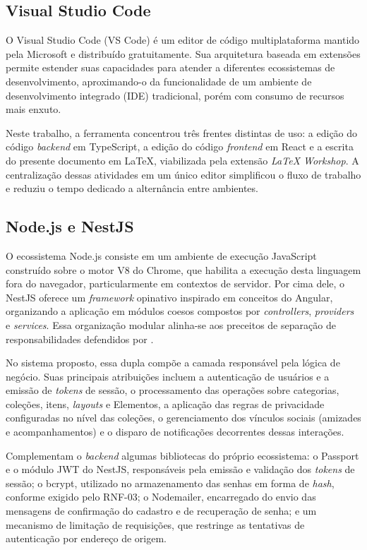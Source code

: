 \subsection{Visual Studio Code}

O Visual Studio Code (VS Code) é um editor de código multiplataforma mantido pela Microsoft e distribuído gratuitamente. Sua arquitetura baseada em extensões permite estender suas capacidades para atender a diferentes ecossistemas de desenvolvimento, aproximando-o da funcionalidade de um ambiente de desenvolvimento integrado (IDE) tradicional, porém com consumo de recursos mais enxuto.

Neste trabalho, a ferramenta concentrou três frentes distintas de uso: a edição do código \textit{backend} em TypeScript, a edição do código \textit{frontend} em React e a escrita do presente documento em LaTeX, viabilizada pela extensão \textit{LaTeX Workshop}. A centralização dessas atividades em um único editor simplificou o fluxo de trabalho e reduziu o tempo dedicado a alternância entre ambientes.

\subsection{Node.js e NestJS}

O ecossistema Node.js consiste em um ambiente de execução JavaScript construído sobre o motor V8 do Chrome, que habilita a execução desta linguagem fora do navegador, particularmente em contextos de servidor. Por cima dele, o NestJS oferece um \textit{framework} opinativo inspirado em conceitos do Angular, organizando a aplicação em módulos coesos compostos por \textit{controllers}, \textit{providers} e \textit{services}. Essa organização modular alinha-se aos preceitos de separação de responsabilidades defendidos por \cite{Fowler2002}.

No sistema proposto, essa dupla compõe a camada responsável pela lógica de negócio. Suas principais atribuições incluem a autenticação de usuários e a emissão de \textit{tokens} de sessão, o processamento das operações sobre categorias, coleções, itens, \textit{layouts} e Elementos, a aplicação das regras de privacidade configuradas no nível das coleções, o gerenciamento dos vínculos sociais (amizades e acompanhamentos) e o disparo de notificações decorrentes dessas interações.

Complementam o \textit{backend} algumas bibliotecas do próprio ecossistema: o Passport e o módulo JWT do NestJS, responsáveis pela emissão e validação dos \textit{tokens} de sessão; o bcrypt, utilizado no armazenamento das senhas em forma de \textit{hash}, conforme exigido pelo RNF-03; o Nodemailer, encarregado do envio das mensagens de confirmação do cadastro e de recuperação de senha; e um mecanismo de limitação de requisições, que restringe as tentativas de autenticação por endereço de origem.

